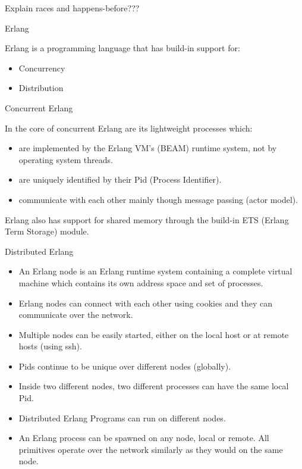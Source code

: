 \documentclass[9pt]{beamer}
\begin{document}
\begin{frame} {}

Explain races and happens-before???

\end{frame}


\begin{frame} {Erlang}

Erlang is a programming language that has build-in support for:

\begin{itemize}
  \item Concurrency
  \item Distribution
\end{itemize}

\end{frame}
\begin{frame} {Concurrent Erlang}

In the core of concurrent Erlang are its lightweight processes which:

\begin{itemize}
  \item are implemented by the Erlang VM's (BEAM) runtime system, not by operating system threads.
  \item are uniquely identified by their Pid (Process Identifier).
  \item communicate with each other mainly though message passing (actor model).

\end{itemize}

Erlang also has support for shared memory through the build-in ETS (Erlang Term Storage) module.

\end{frame}

\begin{frame} {Distributed Erlang}

\begin{itemize}
\item An Erlang node is an Erlang runtime system containing a complete virtual machine which
contains its own address space and set of processes. 
\item Erlang nodes can connect with each other using cookies
and they can communicate over the network. 
\item Multiple nodes can be easily started, either on the local host or at remote hosts (using ssh).
\item Pids continue to be unique over different
nodes (globally).
\item Inside two different nodes, two different processes can have the
same local Pid.
\item Distributed Erlang Programs can run on different nodes. 
\item An Erlang process can be
spawned on any node, local or remote. All primitives operate over the
network similarly as they would on the same node.

\end{itemize}

\end{frame}
\end{document}
